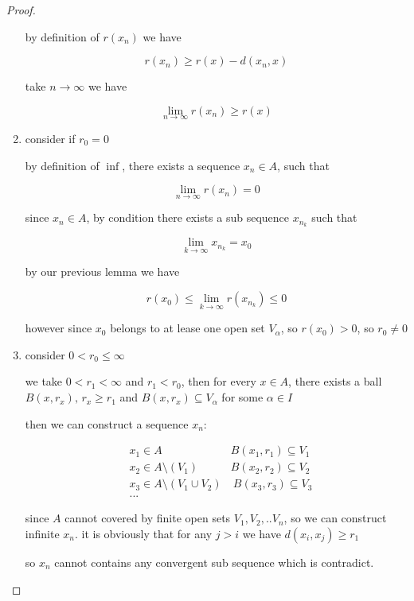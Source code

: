 \begin{proof}
\begin{enumerate}
        by definition of $r(x_n)$ we have

        \[
            r(x_n) \ge r(x) - d(x_n, x)
        \]

        take $n \to \infty$ we have

        \[
            \lim_{n \to \infty}r(x_n) \ge r(x)
        \]


        \item consider if $r_0 = 0$

        by definition of $\inf$, there exists a sequence $x_n \in A$, such that

        \[
            \lim_{n \to \infty}r(x_n) = 0
        \]

        since $x_n \in A$, by condition there exists a sub sequence $x_{n_k}$ such that

        \[
            \lim_{k \to \infty}x_{n_{k}} = x_0 
        \]

        by our previous lemma we have

        \[
            r(x_0) \le \lim_{k \to \infty}r(x_{n_{k}}) \le 0
        \]

        however since $x_0$ belongs to at lease one open set $V_{\alpha}$, so $r(x_0) > 0$, 
        so $r_0 \ne 0 $

        \item consider $0 < r_0 \le \infty$

        we  take $0 < r_1 < \infty$ and $r_1 < r_0$, then for every $x \in A$, there exists
        a ball $B(x, r_x),\, r_x \ge r_1$ and $B(x, r_x) \subseteq V_{\alpha}$ for some $\alpha \in I$

        then we can construct a sequence $x_n$:

        \begin{align*}
            & x_1 \in A\: & B(x_1, r_1) \subseteq V_{1} \\
            & x_2 \in A \setminus (V_1)\: & B(x_2, r_2) \subseteq V_2 \\
            & x_3 \in A \setminus (V_1 \cup V_2) & \: B(x_3, r_3) \subseteq V_3 \\
            & ...
        \end{align*}

        since $A$ cannot covered by finite open sets $V_1, V_2, .. V_n$, so we can construct infinite $x_n$.
        it is obviously that for any $j > i$ we have $d(x_i, x_j) \ge r_1$

        so $x_n$ cannot contains any convergent sub sequence which is contradict.



    \end{enumerate}
\end{proof}


